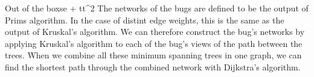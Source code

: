 \documentclass{writeup}
\begin{document}
\begin{solutions}
  \begin{solution}{Out of the box}{se + t}{t^2}
    The networks of the bugs are defined to be the output of Prims algorithm.
    In the case of distint edge weights, this is the same as the output of Kruskal's algorithm.
    We can therefore construct the bug's networks by applying Kruskal's algorithm to each of the bug's views of the path between the trees.
    When we combine all these minimum spanning trees in one graph, we can find the shortest path through the combined network with Dijkstra's algorithm.
  \end{solution}
\end{solutions}
\end{document}
